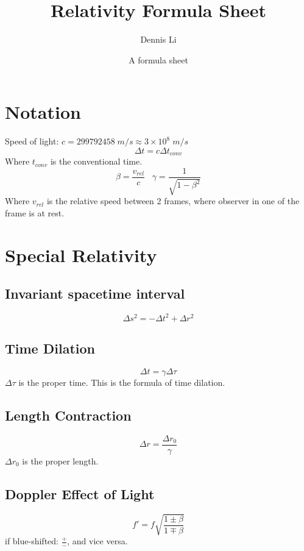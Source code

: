 \documentclass[12pt]{article}
\title{Relativity Formula Sheet}
\author{Dennis Li}
\date{A formula sheet}
\begin{document}
\maketitle


\section*{Notation}
Speed of light: $c = 299792458 \; m/s \approx 3\times 10^{8}\; m/s$\\
\[
\Delta t = c\Delta t_{conv}
\]
Where $t_{conv}$ is the conventional time.
\[
\beta = \frac{v_{rel}}{c} \;\;\; \gamma = \frac{1}{\sqrt{1-\beta^2}}
\]
Where $v_{rel}$ is the relative speed between 2 frames, where observer in one of the frame is at rest.



\section{Special Relativity}
\subsection{Invariant spacetime interval}
\[
\Delta s^2 = -\Delta t^2 + \Delta r^2
\]
\subsection{Time Dilation}
\[
\Delta t = \gamma \Delta \tau
\]
$\Delta \tau $ is the proper time. This is the formula of time dilation. 

\subsection{Length Contraction}
\[
\Delta r = \frac{\Delta r_0}{\gamma}
\]
$\Delta r_0$ is the proper length.
\subsection{Doppler Effect of Light}
\[
f' = f \sqrt{\frac{1\pm\beta}{1\mp \beta}}
\]
if blue-shifted: $\frac{+}{-}$, and vice versa.
\end{document}
